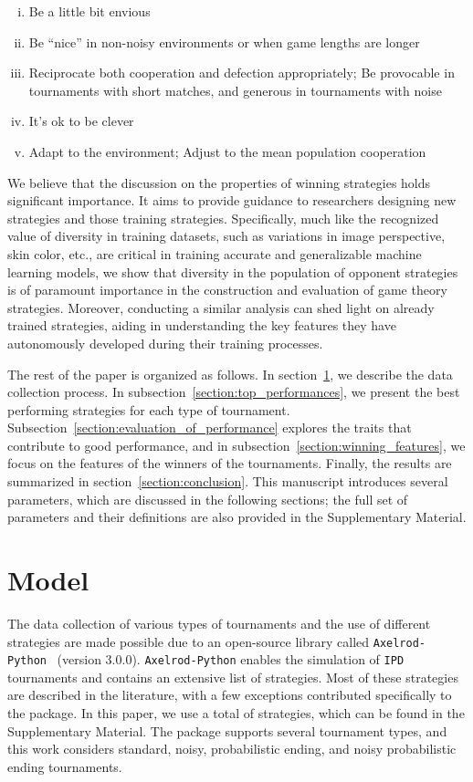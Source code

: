 \documentclass{article}
\newcommand{\numberofstrategies}{}
\def\axelrod{\texttt{Axelrod-Python}}
\def\IPD{\texttt{IPD}}
\begin{document}
\begin{enumerate}[(i)]
    \item Be a little bit envious
    \item Be ``nice'' in non-noisy environments or when game lengths are longer
    \item Reciprocate both cooperation and defection appropriately;
    Be provocable in tournaments with short matches, and generous in tournaments with noise
    \item It's ok to be clever
    \item Adapt to the environment; Adjust to the mean population cooperation
\end{enumerate}

We believe that the discussion on the properties of winning strategies holds
significant importance. It aims to provide guidance to researchers designing new
strategies and those training strategies. Specifically, much like the recognized
value of diversity in training datasets, such as variations in image perspective,
skin color, etc., are critical in training accurate and generalizable machine
learning models, we show that diversity in the population of opponent strategies
is of paramount importance in the construction and evaluation of game theory
strategies. Moreover, conducting a similar
analysis can shed light on already trained strategies, aiding in understanding
the key features they have autonomously developed during their training
processes.

The rest of the paper is organized as follows. In
section~\ref{section:data_collection}, we describe the data collection process.
In subsection~\ref{section:top_performances}, we present the best performing
strategies for each type of tournament.
Subsection~\ref{section:evaluation_of_performance} explores the traits that
contribute to good performance, and in
subsection~\ref{section:winning_features}, we focus on the features of the
winners of the tournaments. Finally, the results are summarized in
section~\ref{section:conclusion}. This manuscript introduces several parameters,
which are discussed in the following sections; the full set of parameters and
their definitions are also provided in the Supplementary Material.

\section{Model}\label{section:data_collection}

The data collection of various types of tournaments and the use of different
strategies are made possible due to an open-source library called \axelrod{}~\cite{axelrodproject}
(version 3.0.0). \axelrod{} enables the simulation of \IPD{}
tournaments and contains an extensive list of strategies. Most of these
strategies are described in the literature, with a few exceptions contributed
specifically to the package. In this paper, we use a total of
\numberofstrategies strategies, which can be found in the Supplementary
Material. The package supports several tournament types, and this work considers
standard, noisy, probabilistic ending, and noisy probabilistic ending
tournaments.
\end{document}
